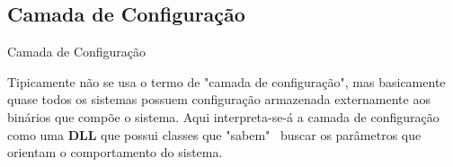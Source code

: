 	\subsection{Camada de Configuração}

	\begin{frame}
	
	\begin{CaixaModelo01}{Camada de Configuração}
	
		Tipicamente não se usa o termo de "camada de configuração", mas basicamente 
		quase todos os sistemas possuem configuração armazenada externamente 
		aos binários que compõe o sistema.
		\newline
		 Aqui interpreta-se-á a camada de configuração 
		como uma \textbf{DLL} que possui classes que "sabem" \, buscar os parâmetros que orientam o comportamento
		do sistema. 
	
	\end{CaixaModelo01}

	\end{frame}
